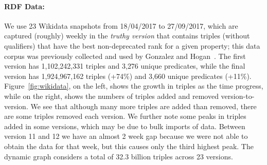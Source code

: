\documentclass[runningheads]{llncs}
\begin{document}
\paragraph{RDF Data:} We use 23 Wikidata snapshots from 18/04/2017 to 27/09/2017, which are captured (roughly) weekly in the \emph{truthy version} that contains triples (without qualifiers) that have the best non-deprecated rank for a given property; this data corpus was previously collected and used by Gonzalez and Hogan~\cite{GonzalezH18}. The first version has 1,102,242,331 triples and 3,276 unique predicates, while the final version has 1,924,967,162 triples (+74\%) and 3,660 unique predicates (+11\%). Figure~\ref{fig:wikidata}, on the left, shows the growth in triples as the time progress, while on the right, shows the numbers of triples added and removed version-to-version. We see that although many more triples are added than removed, there are some triples removed each version. We further note some peaks in triples added in some versions, which may be due to bulk imports of data. Between version 11 and 12 we have an almost 2 week gap because we were not able to obtain the data for that week, but this causes only the third highest peak. The dynamic graph considers a total of 32.3 billion triples across 23 versions.
\end{document}
